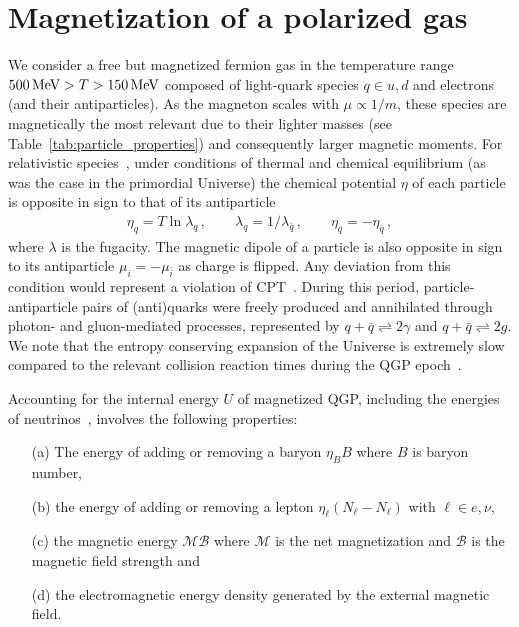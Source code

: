 \documentclass[epjST]{svjour}
\newcommand*{\MeV}{\text{\,MeV}}
\begin{document}
\section{Magnetization of a polarized gas}
\label{sec:magnetization}
We consider a free but magnetized fermion gas in the temperature range \(500\MeV>T>150\MeV\) composed of light-quark species \(q \in {u,d}\) and electrons (and their antiparticles). As the magneton scales with \(\mu \propto 1/m\), these species are magnetically the most relevant due to their lighter masses (see Table~\ref{tab:particle_properties}) and consequently larger magnetic moments. For relativistic species~\cite{Elze:1980er}, under conditions of thermal and chemical equilibrium (as was the case in the primordial Universe) the chemical potential \(\eta\) of each particle is opposite in sign to that of its antiparticle
\begin{align}
    \eta_{q}=T\ln\lambda_{q}\,,\qquad
    \lambda_{q}=1/\lambda_{\bar{q}}\,,\qquad
    \eta_{q}=-\eta_{\bar{q}}\,,
\end{align}
where \(\lambda\) is the fugacity. The magnetic dipole of a particle is also opposite in sign to its antiparticle $\mu_{i}=-\mu_{\bar{i}}$ as charge is flipped. Any deviation from this condition would represent a violation of CPT~\cite{Colladay:1996iz,Bluhm:1997ci,BASE:2016yuo}. During this period, particle-antiparticle pairs of (anti)quarks were freely produced and annihilated through photon- and gluon-mediated processes, represented by \(q+\bar{q}\rightleftharpoons2\gamma\) and \(q+\bar{q}\rightleftharpoons2g\). We note that the entropy conserving expansion of the Universe is extremely slow compared to the relevant collision reaction times during the QGP epoch~\cite{Yang:2024ret}.

Accounting for the internal energy $U$ of magnetized QGP, including the energies of neutrinos~\cite{Birrell:2014ona}, involves the following properties: 
\begin{itemize}
    \item[(a)] The energy of adding or removing a baryon $\eta_{B}B$ where \(B\) is baryon number,
    \item[(b)] the energy of adding or removing a lepton $\eta_{\ell}(N_{\ell}-N_{\ell})$ with $\ell\in {e,\nu}$, 
    \item[(c)] the magnetic energy $\mathcal{M}\mathcal{B}$ where $\mathcal{M}$ is the net magnetization and $\mathcal{B}$ is the magnetic field strength and
    \item[(d)] the electromagnetic energy density generated by the external magnetic field.
\end{itemize}
\end{document}
